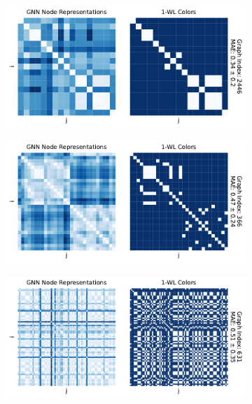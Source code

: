 \begin{figure}[!htb]
\begin{subfigure}[b]{0.49\textwidth}
		\vspace*{-5ex} 
        \caption{\mutag}
	\end{subfigure}
	\hfill
	\begin{subfigure}[b]{0.49\textwidth}
		\centering
		\includegraphics[width=\textwidth]{Figures/heatmaps_NCI1_single.pdf}
		\vspace*{-5ex} 
        \caption{\nci}
	\end{subfigure}
	\par\bigskip
	\begin{subfigure}[b]{0.49\textwidth}
		\centering
		\includegraphics[width=\textwidth]{Figures/heatmaps_PROTEINS_single.pdf}
		\vspace*{-5ex} 
        \caption{\proteins}
	\end{subfigure}
	\hfill
	\begin{subfigure}[b]{0.49\textwidth}
		\centering
		\includegraphics[width=\textwidth]{Figures/heatmaps_REDDIT-BINARY_single.pdf}

\end{subfigure}
\end{figure}
